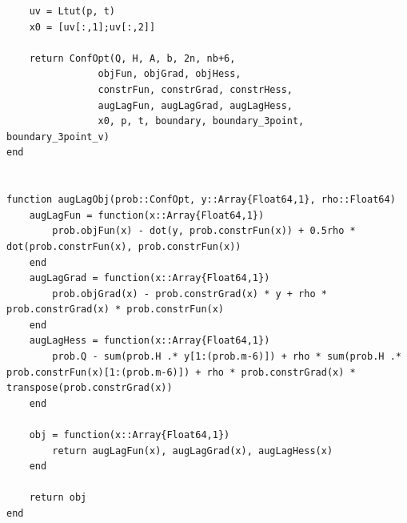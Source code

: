\documentclass{article} %
\begin{document}
\begin{lstlisting}
	uv = Ltut(p, t)
	x0 = [uv[:,1];uv[:,2]]

    return ConfOpt(Q, H, A, b, 2n, nb+6,
    			objFun, objGrad, objHess,
    			constrFun, constrGrad, constrHess,
    			augLagFun, augLagGrad, augLagHess,
    			x0, p, t, boundary, boundary_3point, boundary_3point_v)
end


function augLagObj(prob::ConfOpt, y::Array{Float64,1}, rho::Float64)
	augLagFun = function(x::Array{Float64,1})
    	prob.objFun(x) - dot(y, prob.constrFun(x)) + 0.5rho * dot(prob.constrFun(x), prob.constrFun(x))
	end
	augLagGrad = function(x::Array{Float64,1})
    	prob.objGrad(x) - prob.constrGrad(x) * y + rho * prob.constrGrad(x) * prob.constrFun(x)
	end
	augLagHess = function(x::Array{Float64,1})
		prob.Q - sum(prob.H .* y[1:(prob.m-6)]) + rho * sum(prob.H .* prob.constrFun(x)[1:(prob.m-6)]) + rho * prob.constrGrad(x) * transpose(prob.constrGrad(x))
	end

	obj = function(x::Array{Float64,1}) 
		return augLagFun(x), augLagGrad(x), augLagHess(x)
	end

	return obj
end

\end{lstlisting}
\end{document}
